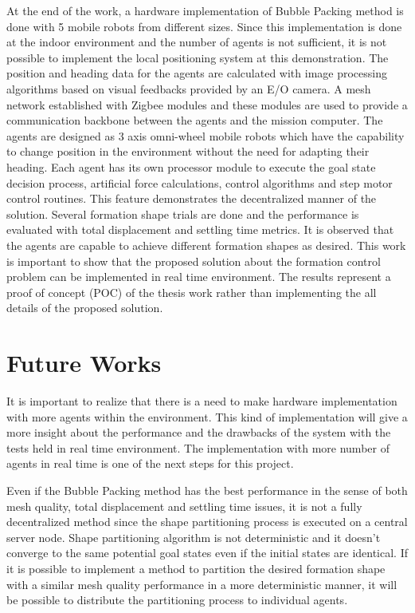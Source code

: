 At the end of the work, a hardware implementation of Bubble Packing method is done with 5 mobile robots from different sizes. Since this implementation is done at the  indoor environment and the number of agents is not sufficient, it is not possible to implement the local positioning system at this demonstration. The position and heading data for the agents are calculated with image processing algorithms based on visual feedbacks provided by an E/O camera. A mesh network established with Zigbee modules and these modules are used to provide a communication backbone between the agents and the mission computer. The agents are designed as 3 axis omni-wheel mobile robots which have the capability to change position in the environment without the need for adapting their heading. Each agent has its own processor module to execute the goal state decision process, artificial force calculations, control algorithms and step motor control routines. This feature demonstrates the decentralized manner of the solution. Several formation shape trials are done and the performance is evaluated with total displacement and settling time metrics. It is observed that the agents are capable to achieve different formation shapes as desired. This work is important to show that the proposed solution about the formation control problem can be implemented in real time environment. The results represent a proof of concept (POC) of the thesis work rather than implementing the all details of the proposed solution.
       
\section{Future Works}
It is important to realize that there is a need to make hardware implementation with more agents within the environment. This kind of  implementation will give a more insight about the performance and the drawbacks of the system with the tests held in real time environment. The implementation with more number of agents in real time is one of the next steps for this project.
		
Even if the Bubble Packing method has the best performance in the sense of both mesh quality, total displacement and settling time issues, it is not a fully decentralized method since the shape partitioning process is executed on a central server node. Shape partitioning algorithm is not deterministic and it doesn't converge to the same potential goal states even if the initial states are identical. If it is possible to implement a method to partition the desired formation shape with a similar mesh quality performance in a more deterministic manner, it will be possible to distribute the partitioning process to individual agents. 
    
